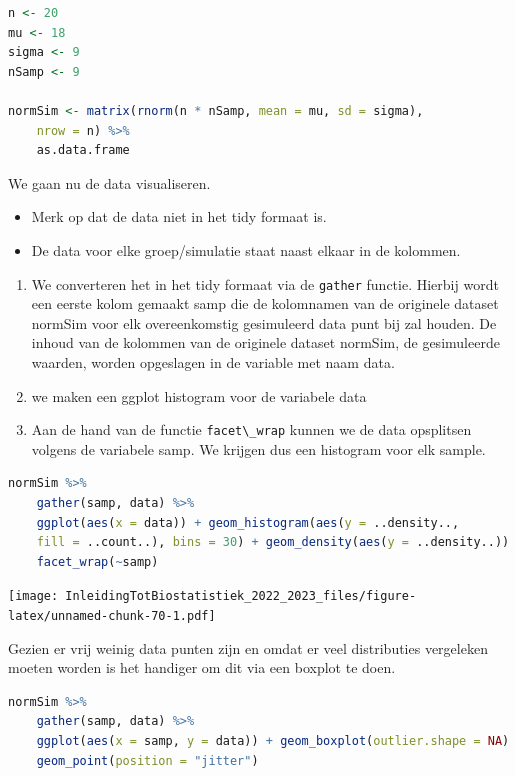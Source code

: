 \documentclass[
  12pt,dutch,coursenotes]{book}
\newcommand{\passthrough}[1]{#1}
\providecommand{\tightlist}{%
  \setlength{\itemsep}{0pt}\setlength{\parskip}{0pt}}
\begin{document}
\begin{lstlisting}[language=R]
n <- 20
mu <- 18
sigma <- 9
nSamp <- 9

normSim <- matrix(rnorm(n * nSamp, mean = mu, sd = sigma),
    nrow = n) %>%
    as.data.frame
\end{lstlisting}

We gaan nu de data visualiseren.

\begin{itemize}
\tightlist
\item
  Merk op dat de data niet in het tidy formaat is.
\item
  De data voor elke groep/simulatie staat naast elkaar in de kolommen.
\end{itemize}

\begin{enumerate}
\def\labelenumi{\arabic{enumi}.}
\item
  We converteren het in het tidy formaat via de \passthrough{\lstinline!gather!} functie. Hierbij wordt een eerste kolom gemaakt samp die de kolomnamen van de originele dataset normSim voor elk overeenkomstig gesimuleerd data punt bij zal houden. De inhoud van de kolommen van de originele dataset normSim, de gesimuleerde waarden, worden opgeslagen in de variable met naam data.
\item
  we maken een ggplot histogram voor de variabele data
\item
  Aan de hand van de functie \passthrough{\lstinline!facet\_wrap!} kunnen we de data opsplitsen volgens de variabele samp. We krijgen dus een histogram voor elk sample.
\end{enumerate}

\begin{lstlisting}[language=R]
normSim %>%
    gather(samp, data) %>%
    ggplot(aes(x = data)) + geom_histogram(aes(y = ..density..,
    fill = ..count..), bins = 30) + geom_density(aes(y = ..density..)) +
    facet_wrap(~samp)
\end{lstlisting}

\texttt{[image: InleidingTotBiostatistiek\_2022\_2023\_files/figure-latex/unnamed-chunk-70-1.pdf]}

Gezien er vrij weinig data punten zijn en omdat er veel distributies vergeleken moeten worden is het handiger om dit via een boxplot te doen.

\begin{lstlisting}[language=R]
normSim %>%
    gather(samp, data) %>%
    ggplot(aes(x = samp, y = data)) + geom_boxplot(outlier.shape = NA) +
    geom_point(position = "jitter")
\end{lstlisting}
\end{document}

